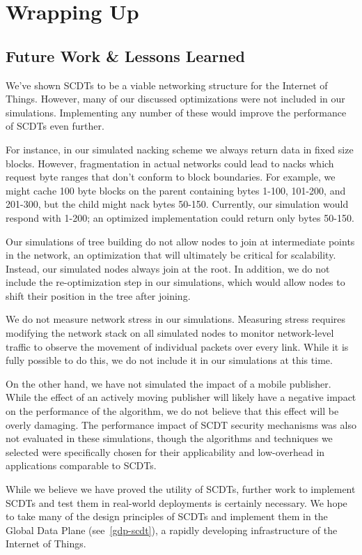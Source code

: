 \chapter{Wrapping Up}

\section{Future Work \& Lessons Learned}
\label{future}
We've shown SCDTs to be a viable networking structure for the Internet of Things. However, many of our discussed optimizations were not included in our simulations. Implementing any number of these would improve the performance of SCDTs even further. 

For instance, in our simulated nacking scheme we always return data in fixed size blocks. However, fragmentation in actual networks could lead to nacks which request byte ranges that don't conform to block boundaries. For example, we might cache 100 byte blocks on the parent containing bytes 1-100, 101-200, and 201-300, but the child might nack bytes 50-150.  Currently, our simulation would respond with 1-200; an optimized implementation could return only bytes 50-150.

Our simulations of tree building do not allow nodes to join at intermediate points in the network, an optimization that will ultimately be critical for scalability. Instead, our simulated nodes always join at the root. In addition, we do not include the re-optimization step in our simulations, which would allow nodes to shift their position in the tree after joining.

We do not measure network stress in our simulations. Measuring stress requires modifying the network stack on all simulated nodes to monitor network-level traffic to observe the movement of individual packets over every link. While it is fully possible to do this, we do not include it in our simulations at this time.

On the other hand, we have not simulated the impact of a mobile publisher. While the effect of an actively moving publisher will likely have a negative impact on the performance of the algorithm, we do not believe that this effect will be overly damaging. The performance impact of SCDT security mechanisms was also not evaluated in these simulations, though the algorithms and techniques we selected were specifically chosen for their applicability and low-overhead in applications comparable to SCDTs.

While we believe we have proved the utility of SCDTs, further work to implement SCDTs and test them in real-world deployments is certainly necessary. We hope to take many of the design principles of SCDTs and implement them in the Global Data Plane (see~\autoref{gdp-scdt}), a rapidly developing infrastructure of the Internet of Things.

